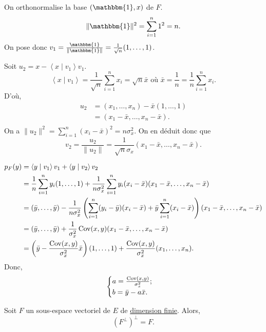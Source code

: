 \begin{exm}
	\let\overline\bar
	On orthonormalise la base $(\mathbbm{1},x)$ de $F$.
	\[
		\|\mathbbm{1}\|^2  = \sum_{i=1}^n 1^2 = n
	.\] On pose donc $v_1 = \frac{\mathbbm{1}}{\|\mathbbm{1}\|} = \frac{1}{\sqrt{n}}(1, \ldots, 1)$.

	Soit $u_2 = x - \left<x \mid v_1 \right>v_1$.
	\[
		\left<x \mid v_1\right> = \frac{1}{\sqrt{n}} \sum_{i=1}^n x_i = \sqrt{n} \overline{x} \text{ où } \overline{x} = \frac{1}{n} = \frac{1}{n}\sum_{i=1}^n x_i
	.\]
	D'où,
	\begin{align*}
		u_2 &= (x_1, \ldots, x_n) - \overline{x} (1, \ldots, 1)\\
		&= (x_1 - \overline{x},\ldots,x_n - \overline{x}). \\
	\end{align*}
	On a $\|u_2\|^2 = \sum_{i=1}^n (x_i - \overline{x})^2 = n \sigma_x^2$. On en déduit donc que \[
		v_2 = \frac{u_2}{\|u_2\|} = \frac{1}{\sqrt{n}\sigma_x}(x_1-\overline{x},\ldots,x_n-\overline{x})
	.\]

	\begin{align*}
		p_F(y) &= \left<y \mid v_1 \right>v_1 + \left<y \mid v_2 \right>v_2\\
		&= \frac{1}{n} \sum_{i=1}^n y_i (1, \ldots, 1) + \frac{1}{n\sigma_x^2} \sum_{i=1}^n y_i (x_i - \overline{x})(x_1 - \overline{x}, \ldots, x_n - \overline{x}) \\
		&= (\overline{y}, \ldots, \overline{y}) - \frac{1}{n\sigma_x^2}\left( \sum_{i=1}^n (y_i - \overline{y})(x_i - \overline{x}) + \overline{y} \sum_{i=1}^n (x_i - \overline{x}) \right)(x_1 -\overline{x}, \ldots, x_n - \overline{x}) \\
		&= (\overline{y}, \ldots, \overline{y}) + \frac{1}{\sigma_x^2}\Cov(x,y)(x_1-\overline{x}, \ldots, x_n - \overline{x}) \\
		&= \left( \overline{y} - \frac{\Cov(x,y)}{\sigma^2_x}\overline{x} \right) (1, \ldots, 1) + \frac{\Cov(x,y)}{\sigma_x^2}(x_1, \ldots, x_n).
	\end{align*}
	Donc, \[
		\begin{cases}
			a = \frac{\Cov(x,y)}{\sigma_x^2};\\
			b = \overline{y} - a\overline{x}.
		\end{cases}
	\]
\end{exm}

\begin{prop}
	Soit $F$ un sous-espace vectoriel de $E$ de \underline{dimension finie}. Alors, \[
		\left( F^\perp \right)^\perp = F
	.\]
\end{prop}

